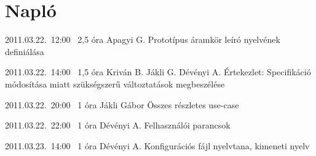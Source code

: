 %
\section{Napló}

\begin{naplo}

\bejegyzes
{2011.03.22.~12:00~} %
{2,5 óra} %
{Apagyi G.} %
{Prototípus áramkör leíró nyelvének definiálása} %

\bejegyzes
{2011.03.22.~14:00~}
{1,5 óra}
{Kriván B.\newline
Jákli G.\newline
Dévényi A.}
{Értekezlet: Specifikáció módosítása miatt szükségszerű változtatások megbeszélése}

\bejegyzes
{2011.03.22.~20:00~}
{1 óra}
{Jákli Gábor}
{Összes részletes use-case}

\bejegyzes
{2011.03.22.~22:00~}
{1 óra}
{Dévényi A.}
{Felhasználói parancsok}

\bejegyzes
{2011.03.23.~14:00~}
{1 óra}
{Dévényi A.}
{Konfigurációs fájl nyelvtana, kimeneti nyelv}


\end{naplo}

